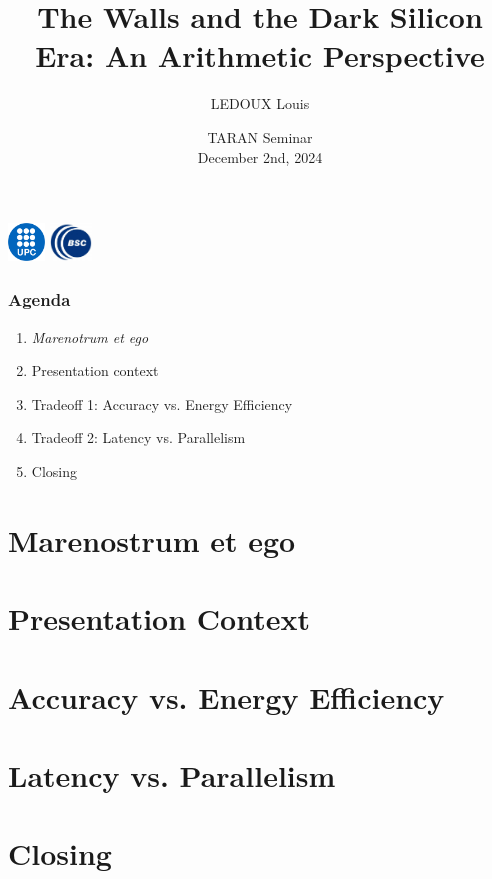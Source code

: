 \documentclass[]{beamer}
\author[TARAN Seminar]{LEDOUX Louis}
\institute[]{Universitat Politècnica de Catalunya (UPC)\\ Barcelona Supercomputing Center (BSC)
\vspace{2mm} \\
}
\title[]{The Walls and the Dark Silicon Era: An Arithmetic Perspective}
\date[December 2nd, 2024]{\small{TARAN Seminar} \\ \small{December 2nd, 2024}}
\begin{document}
\begin{frame}[plain]
	\titlepage
	\begin{center}%
		\vspace{-0.2cm}
		\includegraphics[height=1cm]{./figs/darkblue-logo.pdf}
		\hspace{2mm}
		\includegraphics[height=1cm]{./figs/bsc_logo_2.jpg}
	\end{center}
\end{frame}

\begin{frame}
\frametitle{Agenda}
	\begin{enumerate}
		\item \textit{Marenotrum et ego}
		\item Presentation context
		\item Tradeoff 1: Accuracy vs. Energy Efficiency
		\item Tradeoff 2: Latency vs. Parallelism
		\item Closing
	\end{enumerate}
\end{frame}

\section{Marenostrum et ego}


\section{Presentation Context}


\section{Accuracy vs. Energy Efficiency}


\section{Latency vs. Parallelism}

\section{Closing}

\appendix


 
\end{document}
